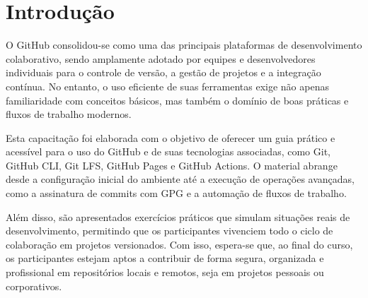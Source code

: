 \chapter{Introdução}

O GitHub consolidou-se como uma das principais plataformas de desenvolvimento colaborativo, sendo amplamente adotado por equipes e desenvolvedores individuais para o controle de versão, a gestão de projetos e a integração contínua. No entanto, o uso eficiente de suas ferramentas exige não apenas familiaridade com conceitos básicos, mas também o domínio de boas práticas e fluxos de trabalho modernos.

Esta capacitação foi elaborada com o objetivo de oferecer um guia prático e acessível para o uso do GitHub e de suas tecnologias associadas, como Git, GitHub CLI, Git LFS, GitHub Pages e GitHub Actions. O material abrange desde a configuração inicial do ambiente até a execução de operações avançadas, como a assinatura de commits com GPG e a automação de fluxos de trabalho.

Além disso, são apresentados exercícios práticos que simulam situações reais de desenvolvimento, permitindo que os participantes vivenciem todo o ciclo de colaboração em projetos versionados. Com isso, espera-se que, ao final do curso, os participantes estejam aptos a contribuir de forma segura, organizada e profissional em repositórios locais e remotos, seja em projetos pessoais ou corporativos.